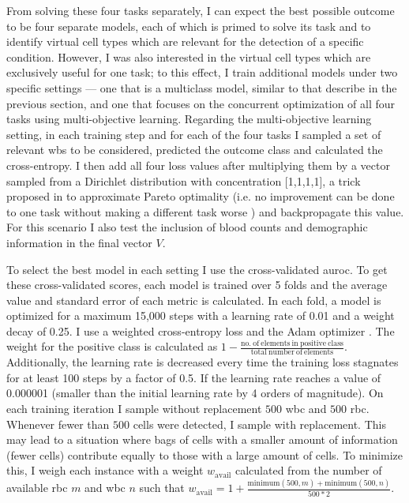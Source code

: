 From solving these four tasks separately, I can expect the best possible outcome to be four separate models, each of which is primed to solve its task and to identify virtual cell types which are relevant for the detection of a specific condition. However, I was also interested in the virtual cell types which are exclusively useful for one task; to this effect, I train additional models under two specific settings --- one that is a multiclass model, similar to that describe in the previous section, and one that focuses on the concurrent optimization of all four tasks using multi-objective learning. Regarding the multi-objective learning setting, in each training step and for each of the four tasks I sampled a set of relevant \ac{wbs} to be considered, predicted the outcome class and calculated the cross-entropy. I then add all four loss values after multiplying them by a vector sampled from a Dirichlet distribution with concentration [1,1,1,1], a trick proposed in \cite{Ruchte2021-ch} to approximate Pareto optimality (i.e. no improvement can be done to one task without making a different task worse \cite{Censor1977-nd}) and backpropagate this value. For this scenario I also test the inclusion of blood counts and demographic information in the final vector $V$.

To select the best model in each setting I use the cross-validated \ac{auroc}. To get these cross-validated scores, each model is trained over 5 folds and the average value and standard error of each metric is calculated. In each fold, a model is optimized for a maximum 15,000 steps with a learning rate of 0.01 and a weight decay of 0.25. I use a weighted cross-entropy loss and the Adam optimizer \cite{Kingma2014-zd}. The weight for the positive class is calculated as $1 - \frac{\mathrm{no.\ of\ elements\ in\ positive\ class}}{\mathrm{total\ number\ of\ elements}}$. Additionally, the learning rate is decreased every time the training loss stagnates for at least 100 steps by a factor of 0.5. If the learning rate reaches a value of 0.000001 (smaller than the initial learning rate by 4 orders of magnitude). On each training iteration I sample without replacement $500$ \ac{wbc} and $500$ \ac{rbc}. Whenever fewer than $500$ cells were detected, I sample with replacement. This may lead to a situation where bags of cells with a smaller amount of information (fewer cells) contribute equally to those with a large amount of cells. To minimize this, I weigh each instance with a weight $w_{\mathrm{avail}}$ calculated from the number of available \ac{rbc} $m$ and \ac{wbc} $n$ such that $w_{\mathrm{avail}} = 1 + \frac{\mathrm{minimum}(500,m) + \mathrm{minimum}(500,n)}{500*2}$.

